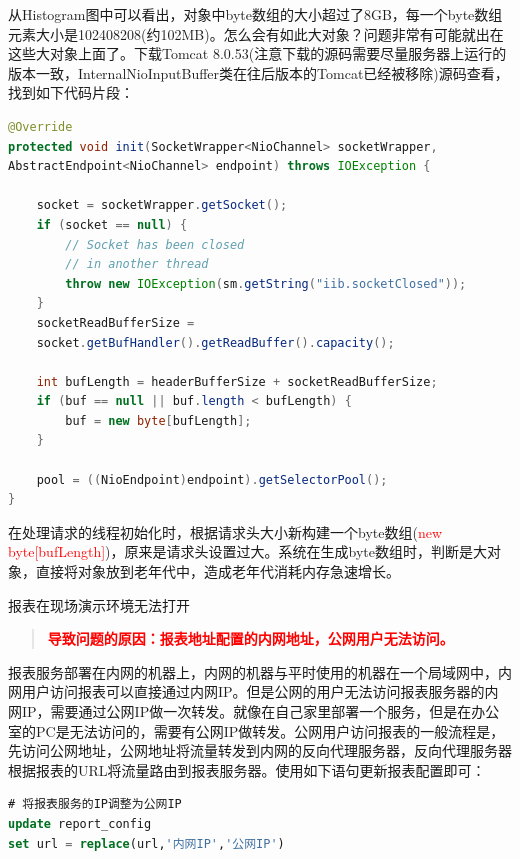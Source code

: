 \documentclass[8pt]{book}
\makeatletter
\numberwithin{dummy}{section}
\theoremstyle{ocrenumbox}
\theoremstyle{blacknumex}
\theoremstyle{blacknumbox}
\theoremstyle{ocrenum}
\renewcommand{\subsection}{\@startsection {subsection}{2}{\z@}
	{-3ex \@plus -0.1ex \@minus -.4ex}
	{0.5ex \@plus.2ex }
	{\normalfont\sffamily\bfseries}}
\makeatother
\begin{document}
从Histogram图中可以看出，对象中byte数组的大小超过了8GB，每一个byte数组元素大小是102408208(约102MB)。怎么会有如此大对象？问题非常有可能就出在这些大对象上面了。下载Tomcat 8.0.53(注意下载的源码需要尽量服务器上运行的版本一致，InternalNioInputBuffer类在往后版本的Tomcat已经被移除)源码查看，找到如下代码片段：

\begin{lstlisting}[language=Java]
@Override
protected void init(SocketWrapper<NioChannel> socketWrapper,
AbstractEndpoint<NioChannel> endpoint) throws IOException {

	socket = socketWrapper.getSocket();
	if (socket == null) {
		// Socket has been closed 
		// in another thread
		throw new IOException(sm.getString("iib.socketClosed"));
	}
	socketReadBufferSize =
	socket.getBufHandler().getReadBuffer().capacity();
	
	int bufLength = headerBufferSize + socketReadBufferSize;
	if (buf == null || buf.length < bufLength) {
		buf = new byte[bufLength];
	}
	
	pool = ((NioEndpoint)endpoint).getSelectorPool();
}
\end{lstlisting}

在处理请求的线程初始化时，根据请求头大小新构建一个byte数组(\textcolor{red}{new byte[bufLength]})，原来是请求头设置过大。系统在生成byte数组时，判断是大对象，直接将对象放到老年代中，造成老年代消耗内存急速增长。

\subsection{报表在现场演示环境无法打开}

\begin{quote}
	\textbf{\textcolor{red}{导致问题的原因：报表地址配置的内网地址，公网用户无法访问。}}
\end{quote}

报表服务部署在内网的机器上，内网的机器与平时使用的机器在一个局域网中，内网用户访问报表可以直接通过内网IP。但是公网的用户无法访问报表服务器的内网IP，需要通过公网IP做一次转发。就像在自己家里部署一个服务，但是在办公室的PC是无法访问的，需要有公网IP做转发。公网用户访问报表的一般流程是，先访问公网地址，公网地址将流量转发到内网的反向代理服务器，反向代理服务器根据报表的URL将流量路由到报表服务器。使用如下语句更新报表配置即可：

\begin{lstlisting}[language=SQL]
# 将报表服务的IP调整为公网IP
update report_config
set url = replace(url,'内网IP','公网IP')
\end{lstlisting}
\end{document}
